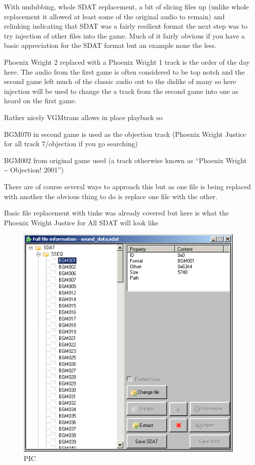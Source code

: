 \documentclass[
]{book}
\begin{document}
With undubbing, whole SDAT replacement, a bit of slicing files up (unlike whole replacement it allowed at least some of the original audio to remain) and relinking indicating that SDAT was a fairly resilient format the next step was to try injection of other files into the game. Much of it fairly obvious if you have a basic appreciation for the SDAT format but an example none the less.

Phoenix Wright 2 replaced with a Phoenix Wright 1 track is the order of the day here. The audio from the first game is often considered to be top notch and the second game left much of the classic audio out to the dislike of many so here injection will be used to change the a track from the second game into one as heard on the first game.

Rather nicely VGMtrans allows in place playback so

BGM070 in second game is used as the objection track (Phoenix Wright Justice for all track 7/objection if you go searching)

BGM002 from original game used (a track otherwise known as ``Phoenix Wright \textasciitilde{} Objection! 2001'')

There are of course several ways to approach this but as one file is being replaced with another the obvious thing to do is replace one file with the other.

Basic file replacement with tinke was already covered but here is what the Phoenix Wright Justice for All SDAT will look like

\begin{figure}
\centering
\includegraphics{images/144_home_fast6191_romhackingguide_unrenamed_fil___inal_borders_romhackingguidesdatinjection_1.png}
\caption{PIC}
\end{figure}
\end{document}
